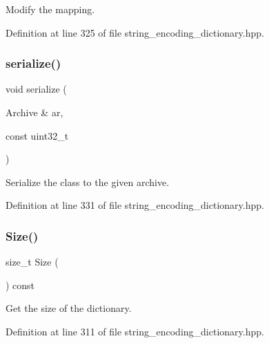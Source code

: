 Modify the mapping. 



Definition at line 325 of file string\+\_\+encoding\+\_\+dictionary.\+hpp.

\mbox{\label{classmlpack_1_1data_1_1StringEncodingDictionary_3_01int_01_4_a65cba07328997659bec80b9879b15a51}} 
\subsubsection{serialize()}
{\footnotesize\ttfamily void serialize (\begin{DoxyParamCaption}\item[{Archive \&}]{ar,  }\item[{const uint32\+\_\+t}]{ }\end{DoxyParamCaption})\hspace{0.3cm}{\ttfamily [inline]}}



Serialize the class to the given archive. 



Definition at line 331 of file string\+\_\+encoding\+\_\+dictionary.\+hpp.

\mbox{\label{classmlpack_1_1data_1_1StringEncodingDictionary_3_01int_01_4_a58f4b9e873b7c1c7d512bd9f7d1489d8}} 
\subsubsection{Size()}
{\footnotesize\ttfamily size\+\_\+t Size (\begin{DoxyParamCaption}{ }\end{DoxyParamCaption}) const\hspace{0.3cm}{\ttfamily [inline]}}



Get the size of the dictionary. 



Definition at line 311 of file string\+\_\+encoding\+\_\+dictionary.\+hpp.

